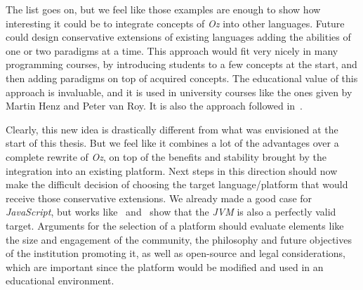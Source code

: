 The list goes on, but we feel like those examples are enough to show how interesting it could be to integrate concepts of \textit{Oz} into other languages.
Future could design conservative extensions of existing languages adding the abilities of one or two paradigms at a time.
This approach would fit very nicely in many programming courses, by introducing students to a few concepts at the start, and then adding paradigms on top of acquired concepts.
The educational value of this approach is invaluable, and it is used in university courses like the ones given by Martin Henz and Peter van Roy.
It is also the approach followed in~\cite{van2004concepts}.\newline

Clearly, this new idea is drastically different from what was envisioned at the start of this thesis.
But we feel like it combines a lot of the advantages over a complete rewrite of \textit{Oz}, on top of the benefits and stability brought by the integration into an existing platform.
Next steps in this direction should now make the difficult decision of choosing the target language/platform that would receive those conservative extensions.
We already made a good case for \textit{JavaScript}, but works like~\cite{Ozma} and~\cite{drejhammar2003flow} show that the \textit{JVM} is also a perfectly valid target.
Arguments for the selection of a platform should evaluate elements like the size and engagement of the community, the philosophy and future objectives of the institution promoting it, as well as open-source and legal considerations, which are important since the platform would be modified and used in an educational environment.
